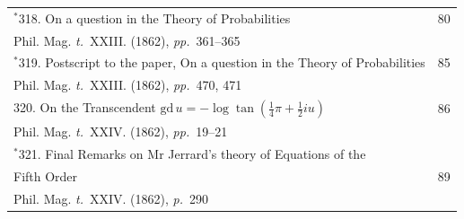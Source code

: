 \documentclass[11pt,a4paper]{article}
\newcommand{\tome}{\textit{t.}}
\newcommand{\page}{\textit{p.}}
\newcommand{\pages}{\textit{pp.}}
\begin{document}
\begin{longtable}{p{4.8in}r}
$^*$318. On a question in the Theory of Probabilities & 80 \\[-0.3em]
\multicolumn{2}{l}{\quad\small Phil. Mag. \tome~XXIII. (1862), \pages~361--365} \\[0.5em]

$^*$319. Postscript to the paper, On a question in the Theory of Probabilities & 85 \\[-0.3em]
\multicolumn{2}{l}{\quad\small Phil. Mag. \tome~XXIII. (1862), \pages~470, 471} \\[0.5em]

320. On the Transcendent $\mathrm{gd}\, u = -\log \tan(\frac{1}{4}\pi + \frac{1}{2}iu)$ & 86 \\[-0.3em]
\multicolumn{2}{l}{\quad\small Phil. Mag. \tome~XXIV. (1862), \pages~19--21} \\[0.5em]

\multicolumn{2}{l}{$^*$321. Final Remarks on Mr Jerrard's theory of Equations of the} \\[-0.3em]
\quad Fifth Order & 89 \\[-0.3em]
\multicolumn{2}{l}{\quad\small Phil. Mag. \tome~XXIV. (1862), \page~290} \\[0.5em]
\end{longtable}

\clearpage
\end{document}
